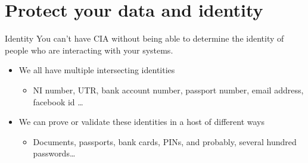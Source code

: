 \documentclass[xcolor=table]{beamer}
\begin{document}
\section{Protect your data and identity}
\begin{frame}{Identity}
	You can't have CIA without being able to determine the identity of people who are interacting with your systems.
	\begin{itemize}
		\item We all have multiple intersecting identities
			\begin{itemize}
				\item NI number, UTR, bank account number, passport number, email address, facebook id \ldots
			\end{itemize}
		\item We can prove or validate these identities in a host of different ways
			\begin{itemize}
				\item Documents, passports, bank cards, PINs, and probably, several hundred passwords\ldots
			\end{itemize}
	\end{itemize}

\end{frame}
\end{document}
